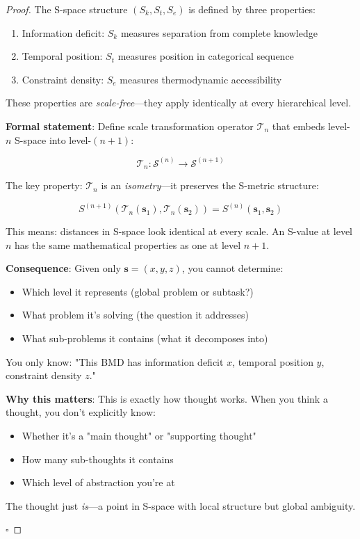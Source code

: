 \documentclass[12pt,a4paper]{article}
\begin{document}
\begin{proof}
The S-space structure $(S_k, S_t, S_e)$ is defined by three properties:
\begin{enumerate}
\item Information deficit: $S_k$ measures separation from complete knowledge
\item Temporal position: $S_t$ measures position in categorical sequence
\item Constraint density: $S_e$ measures thermodynamic accessibility
\end{enumerate}

These properties are \textit{scale-free}—they apply identically at every hierarchical level.

\textbf{Formal statement}: Define scale transformation operator $\mathcal{T}_n$ that embeds level-$n$ S-space into level-$(n+1)$:

\begin{equation}
\mathcal{T}_n: \mathcal{S}^{(n)} \to \mathcal{S}^{(n+1)}
\end{equation}

The key property: $\mathcal{T}_n$ is an \textit{isometry}—it preserves the S-metric structure:

\begin{equation}
S^{(n+1)}(\mathcal{T}_n(\mathbf{s}_1), \mathcal{T}_n(\mathbf{s}_2)) = S^{(n)}(\mathbf{s}_1, \mathbf{s}_2)
\end{equation}

This means: distances in S-space look identical at every scale. An S-value at level $n$ has the same mathematical properties as one at level $n+1$.

\textbf{Consequence}: Given only $\mathbf{s} = (x, y, z)$, you cannot determine:
\begin{itemize}
\item Which level it represents (global problem or subtask?)
\item What problem it's solving (the question it addresses)
\item What sub-problems it contains (what it decomposes into)
\end{itemize}

You only know: "This BMD has information deficit $x$, temporal position $y$, constraint density $z$."

\textbf{Why this matters}: This is exactly how thought works. When you think a thought, you don't explicitly know:
\begin{itemize}
\item Whether it's a "main thought" or "supporting thought"
\item How many sub-thoughts it contains
\item Which level of abstraction you're at
\end{itemize}

The thought just \textit{is}—a point in S-space with local structure but global ambiguity.

$\square$
\end{proof}
\end{document}
